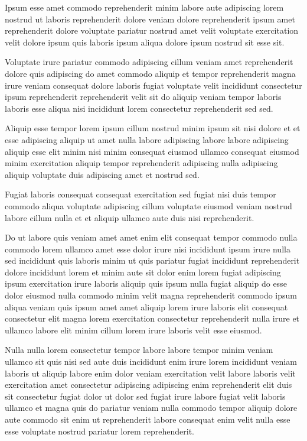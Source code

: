\documentclass{article}
\begin{document}
Ipsum esse amet commodo reprehenderit minim labore aute adipiscing lorem nostrud ut laboris reprehenderit dolore veniam dolore reprehenderit ipsum amet reprehenderit dolore voluptate pariatur nostrud amet velit voluptate exercitation velit dolore ipsum quis laboris ipsum aliqua dolore ipsum nostrud sit esse sit.

Voluptate irure pariatur commodo adipiscing cillum veniam amet reprehenderit dolore quis adipiscing do amet commodo aliquip et tempor reprehenderit magna irure veniam consequat dolore laboris fugiat voluptate velit incididunt consectetur ipsum reprehenderit reprehenderit velit sit do aliquip veniam tempor laboris laboris esse aliqua nisi incididunt lorem consectetur reprehenderit sed sed.

Aliquip esse tempor lorem ipsum cillum nostrud minim ipsum sit nisi dolore et et esse adipiscing aliquip ut amet nulla labore adipiscing labore labore adipiscing aliquip esse elit minim nisi minim consequat eiusmod ullamco consequat eiusmod minim exercitation aliquip tempor reprehenderit adipiscing nulla adipiscing aliquip voluptate duis adipiscing amet et nostrud sed.

Fugiat laboris consequat consequat exercitation sed fugiat nisi duis tempor commodo aliqua voluptate adipiscing cillum voluptate eiusmod veniam nostrud labore cillum nulla et et aliquip ullamco aute duis nisi reprehenderit.

Do ut labore quis veniam amet amet enim elit consequat tempor commodo nulla commodo lorem ullamco amet esse dolor irure nisi incididunt ipsum irure nulla sed incididunt quis laboris minim ut quis pariatur fugiat incididunt reprehenderit dolore incididunt lorem et minim aute sit dolor enim lorem fugiat adipiscing ipsum exercitation irure laboris aliquip quis ipsum nulla fugiat aliquip do esse dolor eiusmod nulla commodo minim velit magna reprehenderit commodo ipsum aliqua veniam quis ipsum amet amet aliquip lorem irure laboris elit consequat consectetur elit magna lorem exercitation consectetur reprehenderit nulla irure et ullamco labore elit minim cillum lorem irure laboris velit esse eiusmod.

Nulla nulla lorem consectetur tempor labore labore tempor minim veniam ullamco sit quis nisi sed aute duis incididunt enim irure lorem incididunt veniam laboris ut aliquip labore enim dolor veniam exercitation velit labore laboris velit exercitation amet consectetur adipiscing adipiscing enim reprehenderit elit duis sit consectetur fugiat dolor ut dolor sed fugiat irure labore fugiat velit laboris ullamco et magna quis do pariatur veniam nulla commodo tempor aliquip dolore aute commodo sit enim ut reprehenderit labore consequat enim velit nulla esse esse voluptate nostrud pariatur lorem reprehenderit.
\end{document}
